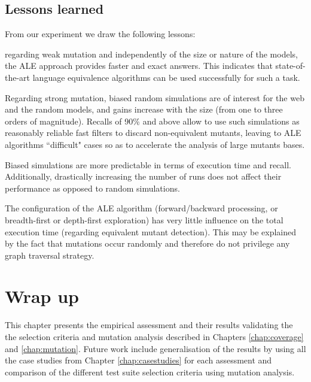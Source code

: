 \subsection{Lessons learned}

From our experiment we draw the following lessons: 
\begin{inparaenum}
\item regarding weak mutation and independently of the size or nature of the models, the ALE approach provides faster and exact answers. This indicates that state-of-the-art language equivalence algorithms can be used successfully for such a task.
\item Regarding strong mutation, biased random simulations are of interest for the web and the random models, and gains increase with the size (from one to three orders of magnitude).  Recalls of 90\% and above allow to use such simulations as reasonably reliable fast filters to discard non-equivalent mutants, leaving to ALE algorithms ``difficult" cases so as to accelerate the analysis of large mutants bases.
\item Biased simulations are more predictable in terms of execution time and recall. Additionally, drastically increasing the number of runs does not affect their performance as opposed to random simulations.    
\item The configuration of the ALE algorithm (forward/backward processing, or breadth-first or depth-first exploration) has very little influence on the total execution time (regarding equivalent mutant detection). This may be explained by the fact that mutations occur randomly and therefore do not privilege any graph traversal strategy.  
\end{inparaenum}


\section{Wrap up}

This chapter presents the empirical assessment and their results validating the the selection criteria and mutation analysis described in Chapters \ref{chap:coverage} and \ref{chap:mutation}. Future work include generalisation of the results by using all the case studies from Chapter \ref{chap:casestudies} for each assessment and comparison of the different test suite selection criteria using mutation analysis. 








